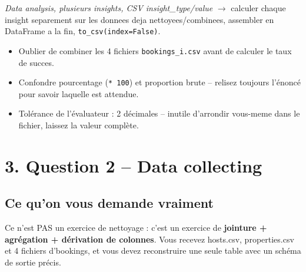\documentclass[11pt]{article}
\newcommand{\exhead}[1]{\subsection{#1}}
\begin{document}
\begin{pat}
\emph{\og Data analysis, plusieurs insights, CSV insight\_type/value \fg}
$\to$ calculer chaque insight separement sur les donnees deja
nettoyees/combinees, assembler en DataFrame a la fin,
\texttt{to\_csv(index=False)}.
\end{pat}

\begin{trap}
\begin{itemize}[nosep]
  \item Oublier de combiner les 4 fichiers \texttt{bookings\_i.csv} avant
        de calculer le taux de succes.
  \item Confondre pourcentage (\texttt{* 100}) et proportion brute --
        relisez toujours l'\'enonc\'e pour savoir laquelle est attendue.
  \item Tol\'erance de l'\'evaluateur : 2 d\'ecimales -- inutile
        d'arrondir vous-meme dans le fichier, laissez la valeur compl\`ete.
\end{itemize}
\end{trap}

\section{3. Question 2 -- Data collecting}

\exhead{Ce qu'on vous demande vraiment}
Ce n'est PAS un exercice de nettoyage : c'est un exercice de
\textbf{jointure + agr\'egation + d\'erivation de colonnes}. Vous recevez
hosts.csv, properties.csv et 4 fichiers
d'bookings, et vous devez reconstruire une seule table
avec un sch\'ema de sortie pr\'ecis.
\end{document}
